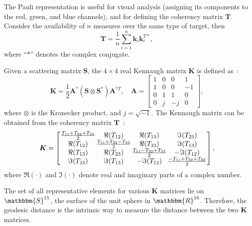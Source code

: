\documentclass[journal]{IEEEtran}
\begin{document}
The Pauli representation is useful for visual analysis (assigning its components to the red, green, and blue channels), and for defining the coherency matrix $\bm T$.
Consider the availability of $n$ measures over the same type of target, then
$$
\bm T = \frac{1}{n} \sum_{i=1}^{n}\bm k_i \bm k_i^{T*},
$$
where ``$*$'' denotes the complex conjugate.

Given a scattering matrix $\bm{S}$, the $4 \times 4$ real Kennaugh matrix $\bm{K}$ is defined as~\cite{Pottier09}:
\begin{equation}
\bm{K} = \frac{1}{2}\bm{A}^*(\bm{S} \otimes \bm{S}^*) \bm{A}^{*T}, \quad \bm{A} = \left[
\begin{array}{cccc}
1 & 0 & 0 & 1\\
1 & 0 & 0 & -1\\
0 & 1 & 1 & 0\\
0 & j & -j & 0
\end{array}\right],
\end{equation}
where $\otimes$ is the Kronecker product, and  $j = \sqrt{-1}$.
The Kennaugh matrix can be obtained from the coherency matrix $\bm{T}$~\cite{PolarisationApplicationsRemoteSensing}:
\begin{equation}
\label{incoKen}
\bm{K} =
\left[\arraycolsep=.7pt
\begin{array}{cccc}
\frac{T_{11}+T_{22}+ T_{33}}{2} & \Re(T_{12}) & \Re(T_{13}) & \Im(T_{23})\\
\Re(T_{12}) & \frac{T_{11}+T_{22}-T_{33}}{2} & \Re(T_{23}) & \Im(T_{13})\\
\Re(T_{13}) & \Re(T_{23}) & \frac{T_{11}-T_{22}+T_{33}}{2} & - \Im(T_{12})\\
\Im(T_{23}) & \Im(T_{13}) & - \Im(T_{12}) &\frac{-T_{11}+T_{22}+T_{33}}{2}
\end{array}\right],
\end{equation}
where $\Re(\cdot)$ and $\Im(\cdot)$ denote real and imaginary parts of a complex number. 

The set of all representative elements for various $\bm{K}$ matrices lie on $\mathbbm{S}^{15}$, the surface of the unit sphere in $\mathbbm{R}^{16}$. 
Therefore, the geodesic distance is the intrinsic way to measure the distance between the two $\bm{K}$ matrices.
\end{document}
